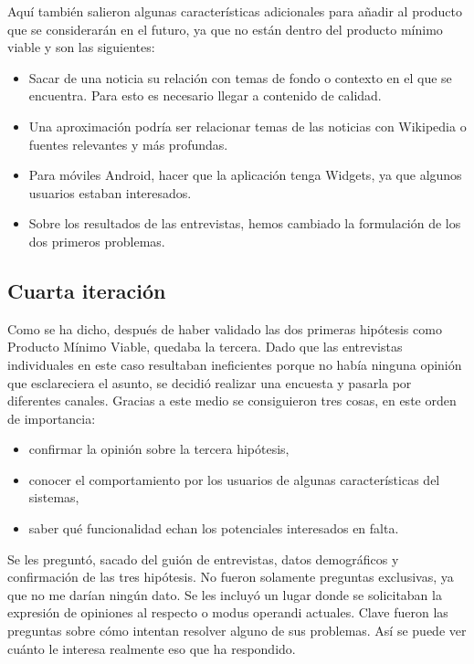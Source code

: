 Aquí también salieron algunas características adicionales para añadir al producto que se considerarán en el futuro, ya que no están dentro del producto mínimo viable y son las siguientes:

\begin{itemize}
    \item Sacar de una noticia su relación con temas de fondo o contexto en el que se encuentra. Para esto es necesario llegar a contenido de calidad.
    \item Una aproximación podría ser relacionar temas de las noticias con Wikipedia o fuentes relevantes y más profundas.
    \item Para móviles Android, hacer que la aplicación tenga Widgets, ya que algunos usuarios estaban interesados.
    \item Sobre los resultados de las entrevistas, hemos cambiado la formulación de los dos primeros problemas.
\end{itemize}


\subsection{Cuarta iteración}

Como se ha dicho, después de haber validado las dos primeras hipótesis como Producto Mínimo Viable, quedaba la tercera. Dado que las entrevistas individuales en este caso resultaban ineficientes porque no había ninguna opinión que esclareciera el asunto, se decidió realizar una encuesta y pasarla por diferentes canales. Gracias a este medio se consiguieron tres cosas, en este orden de importancia:

\begin{itemize}
    \item confirmar la opinión sobre la tercera hipótesis,
    \item conocer el comportamiento por los usuarios de algunas características del sistemas,
    \item saber qué funcionalidad echan los potenciales interesados en falta.
\end{itemize}

Se les preguntó, sacado del guión de entrevistas, datos demográficos y confirmación de las tres hipótesis. No fueron solamente preguntas exclusivas, ya que no me darían ningún dato. Se les incluyó un lugar donde se solicitaban la expresión de opiniones al respecto o modus operandi actuales. Clave fueron las preguntas sobre cómo intentan resolver alguno de sus problemas. Así se puede ver cuánto le interesa realmente eso que ha respondido.


